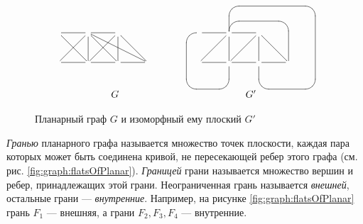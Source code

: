 \begin{figure}
    \[
        \begin{tabular}{cc}
            {\xymatrix{
                *{} &*{}&*{}&*{}&*{}\\
                *{} &*{}&*{}&*{}&*{}\\
                {} \ar@{-}[dr] \ar@{-}[r]
                    &{} \ar@{-}[d] \ar@{-}[dr] \ar@{-}[drr] \ar@{-}[r]
                        &{} \ar@{-}[d] \ar@{-}[dr]
                            &*{}
                                &*{}
                                    \\
                {} \ar@{-}[ur] \ar@{-}[r]
                    &{} \ar@{-}[ur] \ar@{-}[r]
                        &{} \ar@{-}[r]
                            &{}
                                &*{}
                                    \\
                *{} &*{}&*{}&*{}&*{}
            }}
                &
                {\xymatrix{
                    *{} &*{}&*{}&*{}&*{}\\
                    *{} &*{}&*{}&*{}&*{}\\
                    {} 
                        \ar@{-}`l[dd]`[dd]`^u[ddr][dr] 
                        \ar@{-}[r]
                        &{} 
                            \ar@{-}[d] 
                            \ar@{-}`u[u]`[urrr]`[ddrrr]`[dr][dr] 
                            \ar@{-}`u[rr]`[drr][drr] 
                            \ar@{-}[r]
                            &{} \ar@{-}[d] \ar@{-}[dr]
                                &*{}
                                    &*{}
                                        \\
                    {} \ar@{-}[ur] \ar@{-}[r]
                        &{} \ar@{-}[ur] \ar@{-}[r]
                            &{} \ar@{-}[r]
                                &{}
                                    &*{}
                                        \\
                    *{} &*{}&*{}&*{}&*{}
                }}
                    \\
            $G$&$G'$
        \end{tabular}
    \]
    \caption{Планарный граф $G$ и изоморфный ему плоский $G'$}
    \label{fig:graph:planarAndFlat}
\end{figure}

\emph{Гранью} планарного графа называется множество точек плоскости, каждая пара которых может быть соединена кривой, не пересекающей ребер этого графа (см. рис. \ref{fig:graph:flatsOfPlanar}). \emph{Границей} грани называется множество вершин и ребер, принадлежащих этой грани. Неограниченная грань называется \emph{внешней}, остальные грани --- \emph{внутренние}. Например, на рисунке \ref{fig:graph:flatsOfPlanar} грань $F_1$ --- внешняя, а грани $F_2,F_3,F_4$ --- внутренние.

